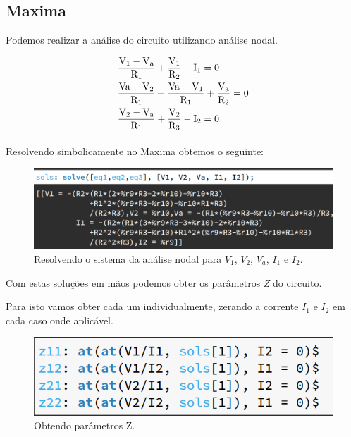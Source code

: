 \documentclass[12pt,twoside, a4paper, twocolumn]{article}
\begin{document}
\pagebreak
\subsection{Maxima}


Podemos realizar a análise do circuito utilizando análise nodal.


\begin{equation}
    \begin{aligned}
         & {{\mathrm{V_1}-\mathrm{V_a}}\over{\mathrm{R_1}}}+{{\mathrm{V_1}}\over{
        \mathrm{R_2}}}-\mathrm{I_1}=0                                             \\
         & {{\mathrm{Va}-\mathrm{V_2}}\over{\mathrm{R_1}}}+{{\mathrm{Va}-
        \mathrm{V_1}}\over{\mathrm{R_1}}}+{{\mathrm{V_a}}\over{\mathrm{R_2}}}=0   \\
         & {{\mathrm{V_2}-\mathrm{V_a}}\over{\mathrm{R_1}}}+{{\mathrm{V_2}}\over{
        \mathrm{R_3}}}-\mathrm{I_2}=0                                             \\
    \end{aligned}
\end{equation}


\paragraph*{}
Resolvendo simbolicamente no Maxima obtemos o seguinte:




\begin{figure}[h]
    \centering
    \includegraphics[width=1\columnwidth]{images/solve.png}
    \caption{Resolvendo o sistema da análise nodal  para $V_1$, $V_2$, $V_a$, $I_1$ e $I_2$.}
\end{figure}


Com estas soluções em mãos podemos obter os parâmetros \emph{Z} do circuito.


Para isto vamos obter cada um individualmente, zerando a corrente $I_1$ e $I_2$ em cada caso onde aplicável.


\begin{figure}[h]
    \centering
    \includegraphics[width=1\columnwidth]{images/parametrosZ.png}
    \caption{Obtendo parâmetros Z.}
\end{figure}
\end{document}
